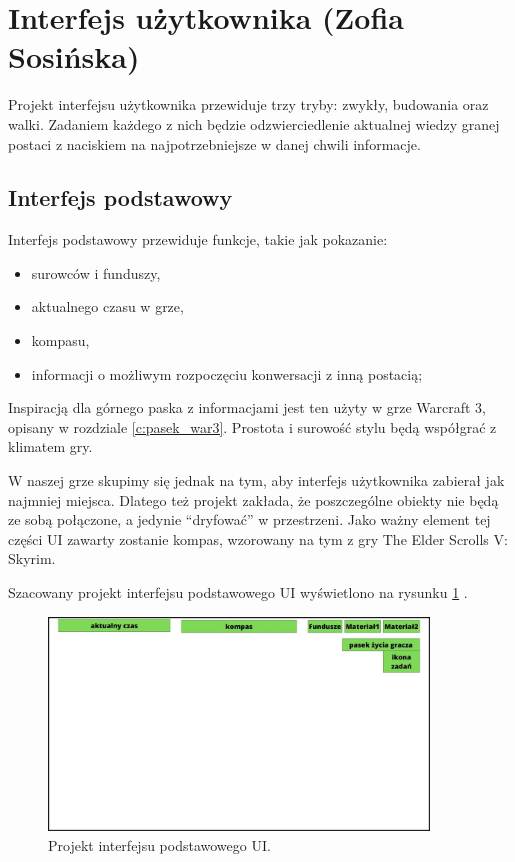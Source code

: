 \section{Interfejs użytkownika (Zofia Sosińska)}\label{chap:ui}
Projekt interfejsu użytkownika przewiduje trzy tryby: zwykły, budowania oraz walki. Zadaniem każdego z nich będzie odzwierciedlenie aktualnej wiedzy granej postaci z naciskiem na najpotrzebniejsze w danej chwili informacje.
	
\subsection{Interfejs podstawowy}
Interfejs podstawowy przewiduje funkcje, takie jak pokazanie:
\begin{itemize}
    \item surowców i funduszy,
    \item aktualnego czasu w grze, 
    \item kompasu,
    \item informacji o możliwym  rozpoczęciu konwersacji z inną postacią;
\end{itemize}
Inspiracją dla górnego paska z informacjami jest ten użyty w grze Warcraft 3, opisany w rozdziale \ref{c:pasek_war3}. Prostota i surowość stylu będą współgrać z klimatem gry.

W naszej grze skupimy się jednak na tym, aby interfejs użytkownika zabierał jak najmniej miejsca. Dlatego też projekt zakłada, że poszczególne obiekty nie będą ze sobą połączone, a jedynie “dryfować” w przestrzeni.
Jako ważny element tej części UI zawarty zostanie kompas, wzorowany na tym z gry The Elder Scrolls V: Skyrim.


Szacowany projekt interfejsu podstawowego UI wyświetlono na rysunku \ref{fig:ui_main} .
\begin{figure}[htbp]
    \centering
    \includegraphics[width=0.9\textwidth]{images/ui/ui_proj_ogolne.jpg}
    \caption{Projekt interfejsu podstawowego UI.
    }\label{fig:ui_main}
\end{figure}
 

